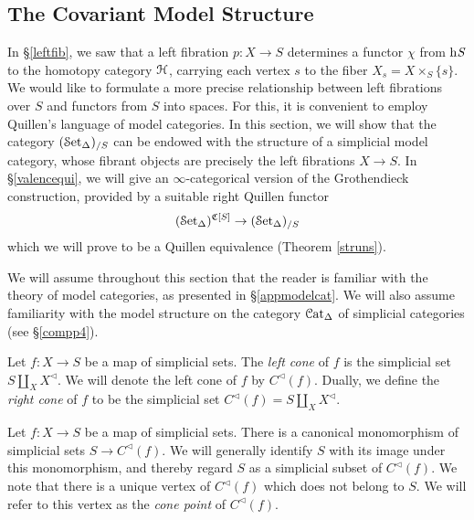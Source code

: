 \subsection{The Covariant Model Structure}\label{contrasec}

In \S \ref{leftfib}, we saw that a left fibration $p: X \rightarrow S$ determines a functor
$\chi$ from $\rm{h} \it{S}$ to the homotopy category $\operatorname{\mathcal{H}}$, carrying each 
vertex $s$ to the fiber $X_{s} = X \times_{S} \{s\}$. We would like to formulate
a more precise relationship between left fibrations over $S$ and functors
from $S$ into spaces. For this, it is convenient to employ Quillen's language of model categories. In this section, we will show that the category $(\operatorname{\mathcal{S}et_{\Delta}})_{/S}$ can be endowed with the structure of a simplicial model category, whose fibrant objects are precisely the left fibrations $X \rightarrow S$. In \S \ref{valencequi}, we will give an $\infty$-categorical version of the Grothendieck construction, provided by a suitable right Quillen functor
$$ (\operatorname{\mathcal{S}et_{\Delta}})^{\operatorname{\mathfrak{C}}[S]} \rightarrow (\operatorname{\mathcal{S}et_{\Delta}})_{/S}$$
which we will prove to be a Quillen equivalence (Theorem \ref{struns}).

\begin{warning}
We will assume throughout this section that the reader is familiar with
the theory of model categories, as presented in \S \ref{appmodelcat}. We will also assume familiarity with the model structure on the category $\operatorname{\mathcal{C}at_{\Delta}}$ of simplicial categories (see \S \ref{compp4}).
\end{warning}

\begin{definition}
Let $f: X \rightarrow S$ be a map of simplicial sets. The
{\it left cone} of $f$ is the simplicial set $S \coprod_{X} X^{\triangleleft}$.
We will denote the left cone of $f$ by $C^{\triangleleft}(f)$.
Dually, we define the {\em right cone} of $f$ to be the simplicial
set $C^{\triangleleft}(f) = S \coprod_{X} X^{\triangleleft}$.
\end{definition}

\begin{remark}
Let $f: X \rightarrow S$ be a map of simplicial sets. There is a canonical monomorphism
of simplicial sets $S \rightarrow C^{\triangleleft}(f)$. We will generally identify $S$ with its image under this monomorphism, and thereby regard $S$ as a simplicial subset of
$C^{\triangleleft}(f)$. We note that there is a unique vertex of
$C^{\triangleleft}(f)$ which does not belong to $S$. We will refer to this vertex as
the {\it cone point} of $C^{\triangleleft}(f)$. 
\end{remark}

